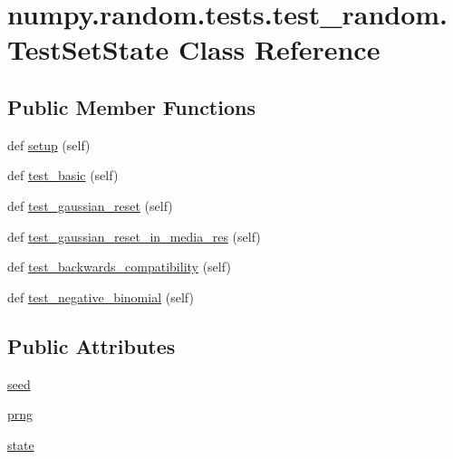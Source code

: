 \hypertarget{classnumpy_1_1random_1_1tests_1_1test__random_1_1TestSetState}{}\section{numpy.\+random.\+tests.\+test\+\_\+random.\+Test\+Set\+State Class Reference}
\label{classnumpy_1_1random_1_1tests_1_1test__random_1_1TestSetState}
\subsection*{Public Member Functions}
\begin{DoxyCompactItemize}
\item 
def \hyperlink{classnumpy_1_1random_1_1tests_1_1test__random_1_1TestSetState_a19de979056ab825e2c63f6ce1dfeef5d}{setup} (self)
\item 
def \hyperlink{classnumpy_1_1random_1_1tests_1_1test__random_1_1TestSetState_a745ce6c5d58df6b696d841f0074642f8}{test\+\_\+basic} (self)
\item 
def \hyperlink{classnumpy_1_1random_1_1tests_1_1test__random_1_1TestSetState_ad72b399a57fd8e6be0c3178da95e1501}{test\+\_\+gaussian\+\_\+reset} (self)
\item 
def \hyperlink{classnumpy_1_1random_1_1tests_1_1test__random_1_1TestSetState_ac0bb77218e0ef654dab4494e5659121d}{test\+\_\+gaussian\+\_\+reset\+\_\+in\+\_\+media\+\_\+res} (self)
\item 
def \hyperlink{classnumpy_1_1random_1_1tests_1_1test__random_1_1TestSetState_a01ff405886a99bac7cba4df2dc427280}{test\+\_\+backwards\+\_\+compatibility} (self)
\item 
def \hyperlink{classnumpy_1_1random_1_1tests_1_1test__random_1_1TestSetState_aa55254318f87f42d632efe67fc038e86}{test\+\_\+negative\+\_\+binomial} (self)
\end{DoxyCompactItemize}
\subsection*{Public Attributes}
\begin{DoxyCompactItemize}
\item 
\hyperlink{classnumpy_1_1random_1_1tests_1_1test__random_1_1TestSetState_aaa0f12a18b36338e1a9bfdd33ecca734}{seed}
\item 
\hyperlink{classnumpy_1_1random_1_1tests_1_1test__random_1_1TestSetState_a5eb55a4b670eb8989ec4a0ab17890b07}{prng}
\item 
\hyperlink{classnumpy_1_1random_1_1tests_1_1test__random_1_1TestSetState_ae7764b3a60d59e09119df0ae97dc7c57}{state}
\end{DoxyCompactItemize}


